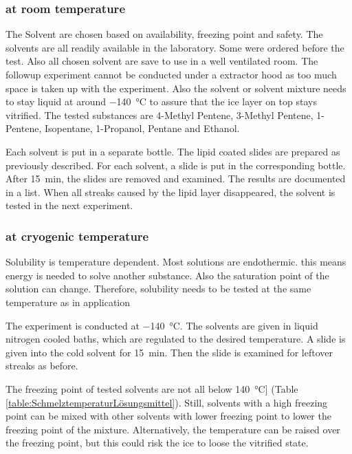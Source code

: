 \subsubsection{at room temperature}

The Solvent are chosen based on availability, freezing point and safety. The solvents are all readily available in the laboratory. Some were ordered before the test. Also all chosen solvent are save to use in a well ventilated room. The followup experiment cannot be conducted under a extractor hood as too much space is taken up with the experiment. Also the solvent or solvent mixture needs to stay liquid at around \SI{-140}{\degreeCelsius} to assure that the ice layer on top stays vitrified. The tested substances are 4-Methyl Pentene, 3-Methyl Pentene, 1-Pentene, Isopentane, 1-Propanol, Pentane and Ethanol. 

Each solvent is put in a separate bottle. The lipid coated slides are prepared as previously described. For each solvent, a slide is put in the corresponding bottle. After \SI{15}{\minute}, the slides are removed and examined. The results are documented in a list. When all streaks caused by the lipid layer disappeared, the solvent is tested in the next experiment.

\subsubsection{at cryogenic temperature}
\label{chapter:meltingtemp}


Solubility is temperature dependent. Most solutions are endothermic. this means energy is needed to solve another substance. Also the saturation point of the solution can change. Therefore, solubility needs to be tested at the same temperature as in application

The experiment is conducted at \SI{-140}{\degreeCelsius}. The solvents are given in liquid nitrogen cooled baths, which are regulated to the desired temperature. A slide is given into the cold solvent for \SI{15}{\minute}. Then the slide is examined for leftover streaks as before.

The freezing point of tested solvents are not all below \SI{140}{\degreeCelsius}] (Table \ref{table:SchmelztemperaturLösungsmittel}). Still, solvents with a high freezing point can be mixed with other solvents with lower freezing point to lower the freezing point of the mixture. Alternatively, the temperature can be raised over the freezing point, but this could risk the ice to loose the vitrified state.

